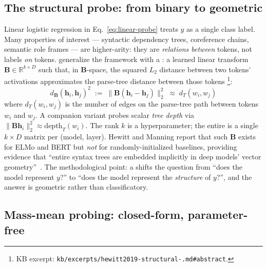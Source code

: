 \subsection{The structural probe: from binary to geometric}
\label{sec:structural-probe}

Linear logistic regression in Eq.~\eqref{eq:linear-probe} treats $y$ as a
single class label. Many properties of interest — syntactic dependency
trees, coreference chains, semantic role frames — are higher-arity:
they are \emph{relations between} tokens, not labels \emph{on} tokens.
\citet{hewitt2019-structural-probe} generalize the framework with a
\emph{}: a learned linear transform
$\mathbf{B} \in \mathbb{R}^{k \times D}$ such that, in $\mathbf{B}$-space,
the squared $L_2$ distance between two tokens' activations approximates
the parse-tree distance between those tokens
\citep{hewitt2019-structural-probe}\footnote{KB excerpt:
\texttt{kb/excerpts/hewitt2019-structural-.md\#abstract}.}:
\begin{equation}
  \boxed{\;
  d_{\mathbf{B}}(\mathbf{h}_i, \mathbf{h}_j)^2
  \;:=\; \|\mathbf{B}(\mathbf{h}_i - \mathbf{h}_j)\|_2^2
  \;\approx\; d_T(w_i, w_j)
  \;}
  \label{eq:structural-probe}
\end{equation}
where $d_T(w_i, w_j)$ is the number of edges on the parse-tree path
between tokens $w_i$ and $w_j$. A companion variant probes scalar
\emph{tree depth} via $\|\mathbf{B}\mathbf{h}_i\|_2^2 \approx
\mathrm{depth}_T(w_i)$. The rank $k$ is a hyperparameter; the entire
 is a single $k \times D$ matrix per (model, layer). Hewitt and
Manning report that such $\mathbf{B}$ exists for ELMo and BERT but
\emph{not} for randomly-initialized baselines, providing evidence that
``entire syntax trees are embedded implicitly in deep models' vector
geometry''~\citep{hewitt2019-structural-probe}. The methodological
point: a  shifts the question from ``does the model
represent $y$?'' to ``does the model represent the \emph{structure} of
$y$?'', and the answer is geometric rather than classificatory.

\subsection{Mass-mean probing: closed-form, parameter-free}
\label{sec:mass-mean}

